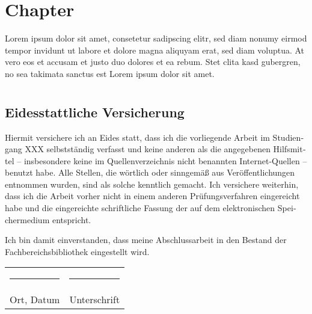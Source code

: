 \documentclass[
	12pt,
	a4paper,
	BCOR10mm,
	DIV14,
	headsepline,
]{scrreprt}
\begin{document}



\appendix
\appendixpage

\chapter{Chapter}

Lorem ipsum dolor sit amet, consetetur sadipscing elitr, sed diam nonumy eirmod tempor invidunt ut labore et dolore magna aliquyam erat, sed diam voluptua.
At vero eos et accusam et justo duo dolores et ea rebum.
Stet clita kasd gubergren, no sea takimata sanctus est Lorem ipsum dolor sit amet.

\listoffigures

\lstlistoflistings

\listoftables

\chapter*{}

\thispagestyle{empty}

\section*{Eidesstattliche Versicherung}

\begin{otherlanguage}{ngerman}
Hiermit versichere ich an Eides statt, dass ich die vorliegende Arbeit im Studiengang XXX selbstständig verfasst und keine anderen als die angegebenen Hilfsmittel -- insbesondere keine im Quellenverzeichnis nicht benannten Internet-Quellen -- benutzt habe.
Alle Stellen, die wörtlich oder sinngemäß aus Veröffentlichungen entnommen wurden, sind als solche kenntlich gemacht.
Ich versichere weiterhin, dass ich die Arbeit vorher nicht in einem anderen Prüfungsverfahren eingereicht habe und die eingereichte schriftliche Fassung der auf dem elektronischen Speichermedium entspricht.

\bigskip

\noindent
Ich bin damit einverstanden, dass meine Abschlussarbeit in den Bestand der Fachbereichsbibliothek eingestellt wird.
\end{otherlanguage}

\bigskip
\bigskip
\bigskip

\begin{center}
\begin{tabular}{ll}
	\rule{0.35\textwidth}{0.4pt} & \rule{0.55\textwidth}{0.4pt} \\
	Ort, Datum & Unterschrift
\end{tabular}
\end{center}
\end{document}
